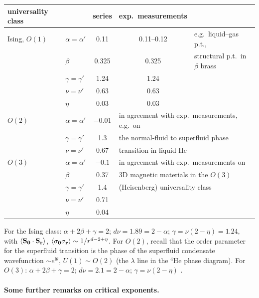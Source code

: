 \begin{center}
\renewcommand{\arraystretch}{1.2}
\begin{tabular}{llccl}
  universality class & & series & exp.\ measurements & \\ \hline
  Ising, $O(1)$ & $\alpha = \alpha'$ & 0.11 & 0.11--0.12 & e.g.\ liquid--gas p.t.,\\
       & $\beta$ & 0.325 & 0.325 & structural p.t.\ in $\beta$ brass\\
       & $\gamma = \gamma'$ & 1.24 & 1.24 & \\
       & $\nu = \nu'$ & 0.63 & 0.63 & \\
       & $\eta$ & 0.03 & 0.03 & \\ \hline
  $O(2)$ & $\alpha = \alpha'$ & $-0.01$ & \multicolumn{2}{l}{in agreement with exp.\ measurements, e.g.\ on}\\
       & $\gamma = \gamma'$ & 1.3 & \multicolumn{2}{l}{the normal-fluid to superfluid phase}\\
       & $\nu = \nu'$ & 0.67 & \multicolumn{2}{l}{transition in liquid He}\\ \hline
  $O(3)$ & $\alpha = \alpha'$ & $-0.1$ & \multicolumn{2}{l}{in agreement with exp.\ measurements on}\\
       & $\beta$ & 0.37 & \multicolumn{2}{l}{3D magnetic materials in the $O(3)$}\\
       & $\gamma = \gamma'$ & 1.4 & \multicolumn{2}{l}{(Heisenberg) universality class}\\
       & $\nu = \nu'$ & 0.71 & & \\
       & $\eta$ & 0.04 & &
\end{tabular}
\end{center}
For the Ising class: $\alpha+2\beta+\gamma = 2$; $d\nu = 1.89 = 2-\alpha$; $\gamma = \nu(2-\eta) = 1.24$,
with $\langle \mathbf S_{\mathbf 0}\cdot\mathbf S_{\mathbf r}\rangle$, $\langle \sigma_{\mathbf 0}\sigma_{\mathbf r}\rangle\sim 1/r^{d-2+\eta}$.
For $O(2)$, recall that the order parameter for the superfluid transition is the phase of the superfluid
condensate wavefunction $\sim e^{\ii\theta}$, $U(1)\sim O(2)$ (the $\lambda$ line in the $^4$He phase
diagram). For $O(3)$: $\alpha+2\beta+\gamma = 2$; $d\nu = 2.1 = 2-\alpha$; $\gamma = \nu(2-\eta)$ \checkmark.

\paragraph{Some further remarks on critical exponents.}

